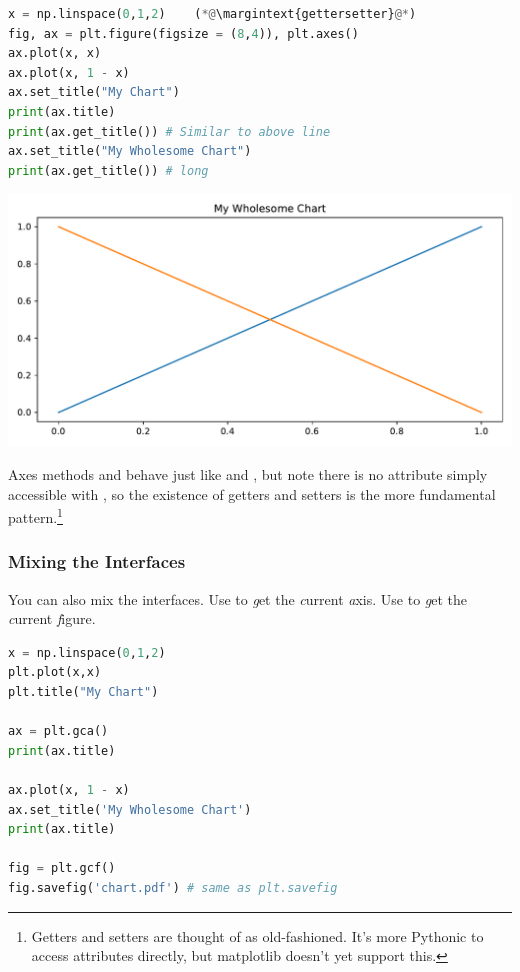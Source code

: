 
 
\begin{lstlisting}[language = Python, caption= {[gettersetter.py]}]
x = np.linspace(0,1,2)    (*@\margintext{gettersetter}@*) 
fig, ax = plt.figure(figsize = (8,4)), plt.axes()
ax.plot(x, x)
ax.plot(x, 1 - x)
ax.set_title("My Chart")
print(ax.title)
print(ax.get_title()) # Similar to above line
ax.set_title("My Wholesome Chart")
print(ax.get_title()) # long
\end{lstlisting}

\begin{center}
    \includegraphics[width = .7\textwidth]{proseplots/gettersetter.pdf}
\end{center}

Axes methods  and  behave just like  and , but note there is no attribute simply accessible with , so the existence of getters and setters is the more fundamental pattern.\footnote{Getters and setters are thought of as old-fashioned. It's more Pythonic to access attributes directly, but matplotlib doesn't yet support this.}

\subsubsection{Mixing the Interfaces}

You can also mix the interfaces. Use  to \emph{g}et the \emph{c}urrent \emph{a}xis. Use  to \emph{g}et the \emph{c}urrent \emph{f}igure.

\begin{lstlisting}[language = Python, caption={[chart.py]}]
x = np.linspace(0,1,2) 
plt.plot(x,x)
plt.title("My Chart")

ax = plt.gca()
print(ax.title)

ax.plot(x, 1 - x)
ax.set_title('My Wholesome Chart')
print(ax.title)

fig = plt.gcf()
fig.savefig('chart.pdf') # same as plt.savefig
\end{lstlisting}

